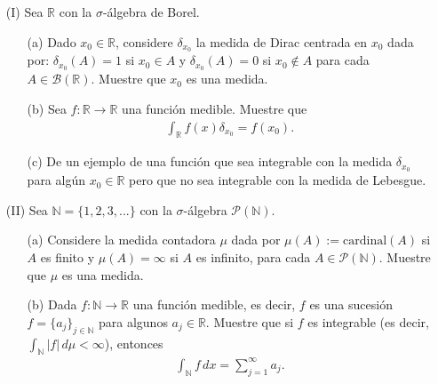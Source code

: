 \begin{enumerate}
    \item[(I)] Sea $\mathbb{R}$ con la $\sigma$-álgebra de Borel.
    \begin{enumerate}
        \item[(a)] Dado $x_0\in \mathbb{R}$, considere $\delta_{x_0}$ la medida de Dirac centrada en $x_0$ dada por: $\delta_{x_0}(A)=1$ si $x_0\in A$ y $\delta_{x_0}(A)=0$ si $x_0\notin A$ para cada $A\in \mathcal{B}(\mathbb{R})$. Muestre que $x_0$ es una medida.
        \item[(b)] Sea $f:\mathbb{R}\to \mathbb{R}$ una función medible. Muestre que 
        \begin{align*}
            \int_{\mathbb{R}}f(x)\delta_{x_0}=f(x_0).
        \end{align*}
        \item[(c)] De un ejemplo de una función que sea integrable con la medida $\delta_{x_0}$ para algún $x_0\in \mathbb{R}$ pero que no sea integrable con la medida de Lebesgue.
    \end{enumerate}
    \item[(II)] Sea $\mathbb{N}=\{1,2,3,...\}$ con la $\sigma$-álgebra $\mathcal{P}(\mathbb{N})$.
    \begin{enumerate}
        \item[(a)] Considere la medida contadora $\mu$ dada por $\mu(A):=\text{cardinal}(A)$ si $A$ es finito y $\mu(A)=\infty$ si $A$ es infinito, para cada $A \in \mathcal{P}(\mathbb{N})$. Muestre que $\mu$ es una medida.
        \item[(b)] Dada $f:\mathbb{N}\to \mathbb{R}$ una función medible, es decir, $f$ es una sucesión $f=\{a_j\}_{j\in \mathbb{N}}$ para algunos $a_j\in \mathbb{R}$. Muestre que si $f$ es integrable (es decir, $\displaystyle \int_{\mathbb{N}}|f|\, d\mu<\infty$), entonces
        \begin{align*}
            \int_{\mathbb{N}}f\, dx=\sum_{j=1}^\infty a_j.
        \end{align*}
    \end{enumerate}
\end{enumerate}
